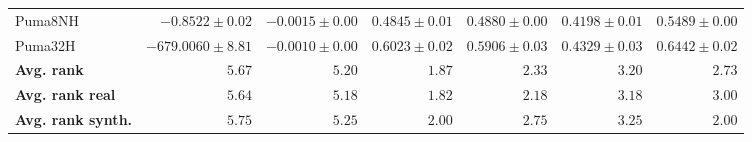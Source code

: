 \begin{table*}[!htbp]
{\begin{tabular}{lrrrrrr}
		Puma8NH & $-0.8522 \pm 0.02$ & $-0.0015 \pm 0.00$ & $0.4845 \pm 0.01$ & $0.4880 \pm 0.00$ & $0.4198 \pm 0.01$ & $\mathbf{0.5489 \pm 0.00}$\\
		Puma32H & $-679.0060 \pm 8.81$ & $-0.0010 \pm 0.00$ & $0.6023 \pm 0.02$ & $0.5906 \pm 0.03$ & $0.4329 \pm 0.03$ & $\mathbf{0.6442 \pm 0.02}$\\
		\midrule
		\textbf{{Avg. rank}} & $5.67$ & $5.20$ & $\mathbf{1.87}$ & $2.33$ & $3.20$ & $2.73$\\
		\textbf{{Avg. rank real}} & $5.64$ & $5.18$ & $\mathbf{1.82}$ & $2.18$ & $3.18$ & $3.00$\\
		\textbf{{Avg. rank synth.}} & $5.75$ & $5.25$ & $\mathbf{2.00}$ & $2.75$ & $3.25$ & $\mathbf{2.00}$\\
		\bottomrule
	\end{tabular}}
\end{table*}
